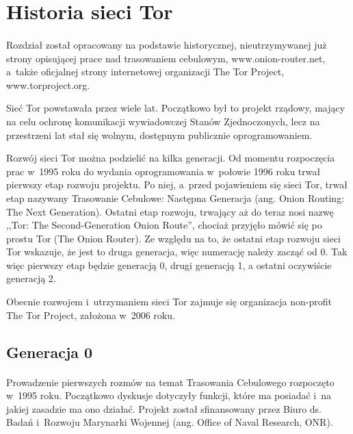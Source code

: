 \setcounter{page}{1}
\section{Historia sieci Tor}\paragraph{}
Rozdział został opracowany na podstawie historycznej, nieutrzymywanej już strony opisującej prace nad trasowaniem cebulowym, www.onion-router.net, a~także oficjalnej strony internetowej organizacji The Tor Project, www.torproject.org.

Sieć Tor powstawała przez wiele lat. Początkowo był to projekt rządowy, mający na celu ochronę komunikacji wywiadowczej Stanów Zjednoczonych, lecz na przestrzeni lat stał się wolnym, dostępnym publicznie oprogramowaniem\cite{onion_router_history, armed_forces}. 

Rozwój sieci Tor można podzielić na kilka generacji. Od momentu rozpoczęcia prac w~1995 roku do wydania oprogramowania w~połowie 1996 roku trwał pierwszy etap rozwoju projektu. Po niej, a~przed pojawieniem się sieci Tor, trwał etap nazywany Trasowanie Cebulowe: Następna Generacja (ang. Onion Routing: The Next Generation). Ostatni etap rozwoju, trwający aż do teraz nosi nazwę ,,Tor: The Second-Generation Onion Route'', chociaż przyjęło mówić się po prostu Tor (The Onion Router). Ze względu na to, że ostatni etap rozwoju sieci Tor wskazuje, że jest to druga generacja, więc numerację należy zacząć od 0. Tak więc pierwszy etap będzie generacją 0, drugi generacją 1, a ostatni oczywiście generacją 2\cite{onion_router}.

Obecnie rozwojem i~utrzymaniem sieci Tor zajmuje się organizacja non-profit The Tor Project, założona w~2006 roku\cite{roadmap_press_release}.

\subsection{Generacja 0}\paragraph{}
Prowadzenie pierwszych rozmów na temat Trasowania Cebulowego rozpoczęto w~1995 roku. Początkowo dyskusje dotyczyły funkcji, które ma posiadać i~na jakiej zasadzie ma ono działać. Projekt został sfinansowany przez Biuro ds. Badań i~Rozwoju Marynarki Wojennej (ang. Office of Naval Research, ONR)\cite{onion_router_history}.

